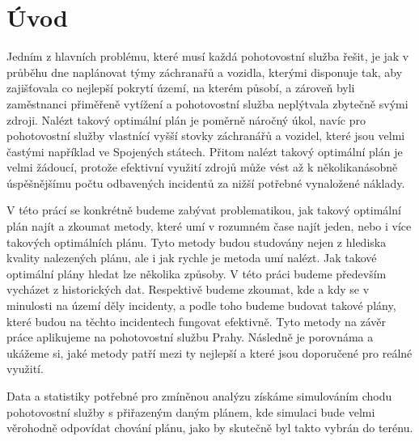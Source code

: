 \chapter*{Úvod}

Jedním z hlavních problému, které musí každá pohotovostní služba řešit, je jak v průběhu dne naplánovat týmy záchranařů a vozidla, kterými disponuje tak,
aby zajišťovala co nejlepší pokrytí území, na kterém působí, a zároveň byli zaměstnanci přiměřeně vytížení a pohotovostní služba neplýtvala zbytečně svými zdroji.
Nalézt takový optimální plán je poměrně náročný úkol, navíc pro pohotovostní služby vlastnící vyšší stovky záchranářů a vozidel, které jsou velmi častými například ve Spojených státech.
Přitom nalézt takový optimální plán je velmi žádoucí, protože efektivní využití zdrojů může vést až k několikanásobně úspěšnějšímu počtu odbavených incidentů
za nižší potřebné vynaložené náklady.

V této prácí se konkrétně budeme zabývat problematikou, jak takový optimální plán najít a zkoumat metody,
které umí v rozumném čase najít jeden, nebo i více takových optimálních plánu.
Tyto metody budou studovány nejen z hlediska kvality nalezených plánu, ale i jak rychle je metoda umí nalézt.
Jak takové optimální plány hledat lze několika způsoby. V této práci budeme především vycházet z historických dat.
Respektivě budeme zkoumat, kde a kdy se v minulosti na území děly incidenty, a podle toho budeme budovat takové plány, které budou na těchto incidentech fungovat efektivně.
Tyto metody na závěr práce aplikujeme na pohotovostní službu Prahy. Následně je porovnáma a ukážeme si, jaké metody patří mezi ty nejlepší a které jsou doporučené pro reálné využití. 

Data a statistiky potřebné pro zmíněnou analýzu získáme simulováním chodu pohotovostní služby s přiřazeným daným plánem, kde simulaci bude velmi věrohodně odpovídat chování plánu,
jako by skutečně byl takto vybrán do terénu.

